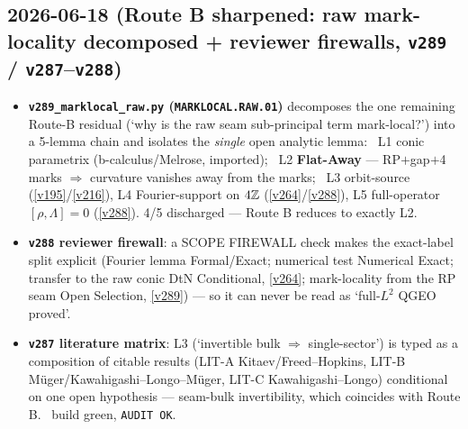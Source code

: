 \subsection*{2026-06-18 (Route B sharpened: raw mark-locality decomposed + reviewer firewalls, \texttt{v289} / \texttt{v287}--\texttt{v288})}
\begin{itemize}
\item \textbf{\texttt{v289\_marklocal\_raw.py} (\texttt{MARKLOCAL.RAW.01})} decomposes the one remaining
  Route-B residual (`why is the raw seam sub-principal term mark-local?') into a 5-lemma chain and
  isolates the \emph{single} open analytic lemma: \mC\ L1 conic parametrix (b-calculus/Melrose, imported);
  \mO\ L2 \textbf{Flat-Away} --- RP$+$gap$+$4 marks $\Rightarrow$ curvature vanishes away from the marks;
  \mE\ L3 orbit-source (\vref{v195}/\vref{v216}), L4 Fourier-support on $4\mathbb{Z}$ (\vref{v264}/\vref{v288}),
  L5 full-operator $[\rho,\Lambda]{=}0$ (\vref{v288}). 4/5 discharged --- Route B reduces to exactly L2.
\item \textbf{\texttt{v288} reviewer firewall}: a SCOPE FIREWALL check makes the exact-label split explicit
  (Fourier lemma Formal/Exact; numerical test Numerical Exact; transfer to the raw conic DtN Conditional,
  \vref{v264}; mark-locality from the RP seam Open Selection, \vref{v289}) --- so it can never be read as
  `full-$L^2$ QGEO proved'.
\item \textbf{\texttt{v287} literature matrix}: L3 (`invertible bulk $\Rightarrow$ single-sector') is typed as
  a composition of citable results (LIT-A Kitaev/Freed--Hopkins, LIT-B M\"uger/Kawahigashi--Longo--M\"uger,
  LIT-C Kawahigashi--Longo) conditional on one open hypothesis --- seam-bulk invertibility, which coincides
  with Route B. \mE\ build green, \texttt{AUDIT OK}.
\end{itemize}

